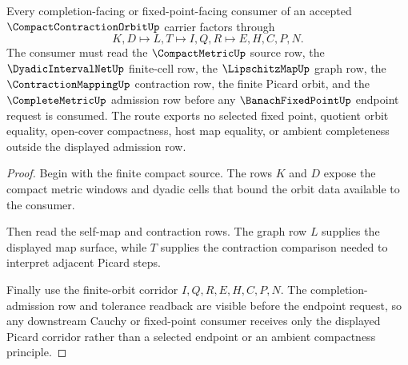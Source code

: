 \begin{theorem}
\label{thm:compact-contraction-orbit-cauchy-handoff}
Every completion-facing or fixed-point-facing consumer of an accepted $\CompactContractionOrbitUp$ carrier factors through
$$
K,D \longmapsto L,T \longmapsto I,Q,R \longmapsto E,H,C,P,N .
$$
The consumer must read the $\CompactMetricUp$ source row, the $\DyadicIntervalNetUp$ finite-cell row, the $\LipschitzMapUp$ graph row, the $\ContractionMappingUp$ contraction row, the finite Picard orbit, and the $\CompleteMetricUp$ admission row before any $\BanachFixedPointUp$ endpoint request is consumed. The route exports no selected fixed point, quotient orbit equality, open-cover compactness, host map equality, or ambient completeness outside the displayed admission row.
\end{theorem}
\begin{proof}
Begin with the finite compact source. The rows $K$ and $D$ expose the compact metric windows and dyadic cells that bound the orbit data available to the consumer.

Then read the self-map and contraction rows. The graph row $L$ supplies the displayed map surface, while $T$ supplies the contraction comparison needed to interpret adjacent Picard steps.

Finally use the finite-orbit corridor $I,Q,R,E,H,C,P,N$. The completion-admission row and tolerance readback are visible before the endpoint request, so any downstream Cauchy or fixed-point consumer receives only the displayed Picard corridor rather than a selected endpoint or an ambient compactness principle.
\end{proof}


\begin{closurestatus}{\CompactContractionOrbitUp}
  \theoryclosure{\seedClosure}
  \formalstatus{\unformalizedV}
\end{closurestatus}
